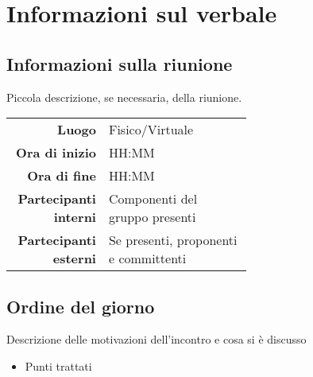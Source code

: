 \section{Informazioni sul verbale}

\subsection{Informazioni sulla riunione}
Piccola descrizione, se necessaria, della riunione.

\begin{center}
	\begin{tabular}{r|p{0.6\linewidth}}
		\toprule
		\textbf{Luogo} & Fisico/Virtuale \\
		\textbf{Ora di inizio} & HH:MM \\
		\textbf{Ora di fine} & HH:MM \\
		\textbf{Partecipanti interni} & Componenti del gruppo presenti \\
		\textbf{Partecipanti esterni} & Se presenti, proponenti e committenti
	\end{tabular}
\end{center}

\medskip

\subsection{Ordine del giorno}
Descrizione delle motivazioni dell'incontro e cosa si è discusso
\begin{itemize}
	\item Punti trattati
\end{itemize}
